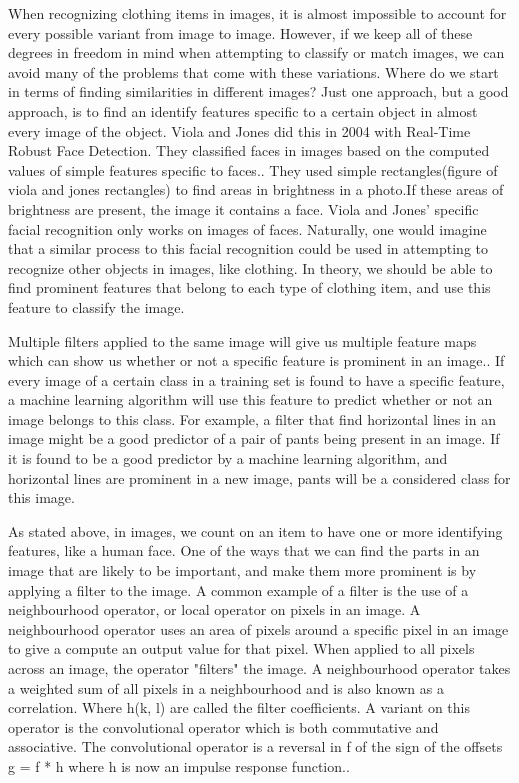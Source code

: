 \documentclass[12pt]{article} %
\begin{document}
	When recognizing clothing items in images, it is almost impossible to account for every possible variant from image to image. However, if we keep all of these degrees in freedom in mind when attempting to classify or match images, we can avoid many of the problems that come with these variations. Where do we start in terms of finding similarities in different images? Just one approach, but a good approach, is to find an identify features specific to a certain object in almost every image of the object. Viola and Jones did this in 2004 with Real-Time Robust Face Detection. They classified faces in images based on the computed values of simple features specific to faces.\cite{viola2004robust}. They used simple rectangles(figure of viola and jones rectangles) to find areas in brightness in a photo.If these areas of brightness are present, the image it contains a face. Viola and Jones' specific facial recognition only works on images of faces. Naturally, one would imagine that a similar process to this facial recognition could be used in attempting to recognize other objects in images, like clothing. In theory, we should be able to find prominent features that belong to each type of clothing item, and use this feature to classify the image.

	
	Multiple filters applied to the same image will give us multiple feature maps which can show us whether or not a specific feature is prominent in an image.\cite{aurelienMachineLearning}. If every image of a certain class in a training set is found to have a specific feature, a machine learning algorithm will use this feature to predict whether or not an image belongs to this class. For example, a filter that find horizontal lines in an image might be a good predictor of a pair of pants being present in an image. If it is found to be a good predictor by a machine learning algorithm, and horizontal lines are prominent in a new image, pants will be a considered class for this image. 
	
		
	 As stated above, in images, we count on an item to have one or more identifying features, like a human face. One of the ways that we can find the parts in an image that are likely to be important, and make them more prominent is by applying a filter to the image. A common example of a filter is the use of a neighbourhood operator, or local operator on pixels in an image. A neighbourhood operator uses an area of pixels around a specific pixel in an image to give a compute an output value for that pixel. When applied to all pixels across an image, the operator "filters" the image. A neighbourhood operator takes a weighted sum of all pixels in a neighbourhood and is also known as a correlation. Where h(k, l) are called the filter coefficients. A variant on this operator is the convolutional operator which is both commutative and associative. The convolutional operator is a reversal in f of the sign of the offsets g = f * h where h is now an impulse response function.\cite{szeliski2010computer}. 
\end{document}
